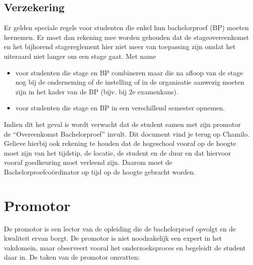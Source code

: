 \subsection{Verzekering}
Er gelden speciale regels voor studenten die enkel hun bachelorproef (BP) moeten hernemen. Er moet dan rekening mee worden gehouden dat  de stageovereenkomst en het bijhorend stagereglement hier niet meer van toepassing zijn omdat het uiteraard niet langer om een stage gaat. Met name 
\begin{itemize}
	\item voor studenten die stage en BP combineren maar die na afloop van de stage nog bij de onderneming of de instelling of in de organisatie aanwezig moeten zijn in het kader van de BP (bijv. bij 2e examenkans).
	\item voor studenten die stage en BP in een verschillend semester opnemen.
\end{itemize}
\begin{framed}
Indien dit het geval is wordt verwacht dat de student samen met zijn promotor de ``Overeenkomst Bachelorproef'' invult. Dit document vind je terug op Chamilo. Gelieve hierbij ook rekening te houden dat de hogeschool vooraf op de hoogte moet zijn van het tijdstip, de locatie, de student en de duur en dat hiervoor vooraf goedkeuring moet verleend zijn. Daarom moet de Bachelorproefcoördinator op tijd op de hoogte gebracht worden.
\end{framed}


\section{Promotor}
De promotor is een lector van de opleiding die de bachelorproef opvolgt en de kwaliteit ervan borgt. De promotor is niet noodzakelijk een expert in het vakdomein, maar observeert vooral het onderzoeksproces en begeleidt de student daar in. De taken van de promotor omvatten:

